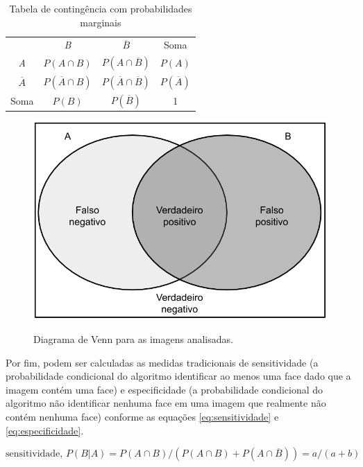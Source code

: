 \begin{table}[htbp]
    \caption{Tabela de contingência com probabilidades marginais}
    \label{tab:tabela_contingencia_probab}
    \centering
    \begin{tabular}{cccc}\hline\hline
        & \textit{B} & $\overline{B}$ & Soma\\
    \textit{A} & $P(A \cap B)$ & $P(A \cap \overline{B})$ & $P(A)$ \\
    $\overline{A}$ & $P(\overline{A} \cap B)$ & $P(\overline{A} \cap \overline{B})$ & $P(\overline{A})$ \\
    Soma & $P(B)$ & $P(\overline{B})$ & 1 \\
    \hline\hline
    \end{tabular}
\end{table}

 \begin{figure}[htbp]
     \centering
     \caption{Diagrama de Venn para as imagens analisadas.}
     \includegraphics[scale=.4]{figs/venn-diagram.png}
     \label{fig:venn_diagram}
  \end{figure}

Por fim, podem ser calculadas as medidas tradicionais de sensitividade (a probabilidade condicional do algoritmo identificar ao menos uma face dado que a imagem contém uma face) e especificidade (a probabilidade condicional do algoritmo não identificar nenhuma face em uma imagem que realmente não contém nenhuma face) conforme as equações \ref{eq:sensitividade} e \ref{eq:especificidade}.

\begin{equation} \label{eq:sensitividade}
    \text{sensitividade, } P(B|A) = P(A \cap B) / (P(A \cap B) + P(A \cap \overline{B})) = a/(a + b)
\end{equation}


